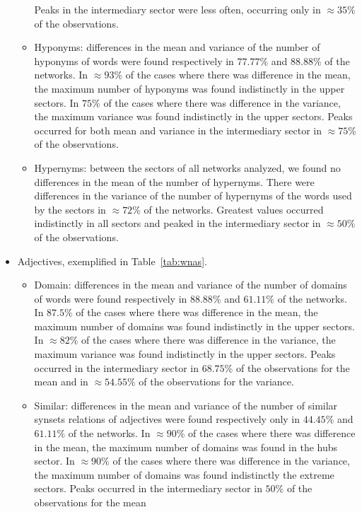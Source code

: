\begin{itemize}
\begin{itemize}
				Peaks in the intermediary sector were less often, occurring only in $\approx 35\%$ of the observations.
			\item Hyponyms:
				differences in the mean and variance of the number of hyponyms of words were found respectively in $77.77\%$ and $88.88\%$ of the networks.
				In $\approx 93\%$ of the cases where there was difference in the mean, 
				the maximum number of hyponyms was found indistinctly in the upper sectors.
				In $75\%$ of the cases where there was difference in the variance, 
				the maximum variance was found indistinctly in the upper sectors.
				Peaks occurred for both mean and variance in the intermediary sector in $\approx 75\%$ of the observations.
			\item Hypernyms:
				between the sectors of all networks analyzed, we found no differences in the mean of the number of hypernyms.
				There were differences in the variance of the number of hypernyms of the words used by the sectors in $\approx 72\%$ of the networks.
				Greatest values occurred indistinctly in all sectors and peaked in the intermediary sector in $\approx 50\%$ of the observations.
		\end{itemize}
	\item Adjectives, exemplified in Table~\ref{tab:wnas}.

		\begin{itemize}
			\item Domain:
				differences in the mean and variance of the number of domains of words were found respectively in $88.88\%$ and $61.11\%$ of the networks.
				In $87.5\%$ of the cases where there was difference in the mean, 
				the maximum number of domains was found indistinctly in the upper sectors.
				In $\approx 82\%$ of the cases where there was difference in the variance, 
				the maximum variance was found indistinctly in the upper sectors.
				Peaks occurred in the intermediary sector in $68.75\%$ of the observations for the mean
				and in $\approx 54.55\%$ of the observations for the variance.
			\item Similar:
				differences in the mean and variance of the number of similar synsets relations of adjectives were found respectively only in $44.45\%$ and $61.11\%$ of the networks.
				In $\approx 90\%$ of the cases where there was difference in the mean, 
				the maximum number of domains was found in the hubs sector.
				In $\approx 90\%$ of the cases where there was difference in the variance, 
				the maximum number of domains was found indistinctly the extreme sectors.
				Peaks occurred in the intermediary sector in $50\%$ of the observations for the mean

\end{itemize}
\end{itemize}
